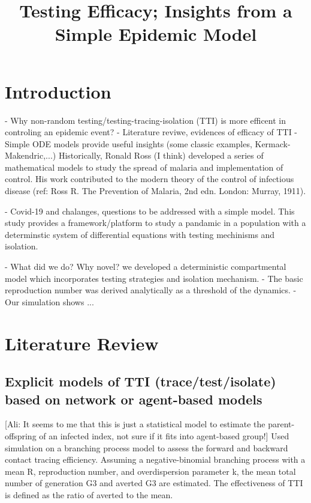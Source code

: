 \documentclass{article}
\title{Testing Efficacy; Insights from a Simple Epidemic Model }
\begin{document}
\maketitle

\section{Introduction}

- Why non-random testing/testing-tracing-isolation (TTI) is more efficent in controling an epidemic event?
- Literature reviwe, evidences of efficacy of TTI
- Simple ODE models provide useful insights (some classic examples, Kermack-Makendric,...)
Historically, Ronald Ross (I think) developed a series of mathematical models to study the spread of malaria and implementation of control. His work contributed to the modern theory of the control of
infectious disease (ref: Ross R. The Prevention of Malaria, 2nd edn. London: Murray, 1911).


- Covid-19 and chalanges, questions to be addressed with a simple model.
This study provides a framework/platform to study a pandamic in a population with a determinstic system of differential equations with testing mechinisms and isolation. 

- What did we do? Why novel? 
we developed a deterministic compartmental model which incorporates testing strategies and isolation mechanism. 
- The basic reproduction number was derived analytically as a threshold of the dynamics. 
- Our simulation shows ...

\section{Literature Review}

\subsection{Explicit models of TTI (trace/test/isolate) based on network or agent-based models}
\citep{endo2020implication} [Ali: It seems to me that this is just a statistical model to estimate the parent-offspring of an infected index, not sure if it fits into agent-based group!] Used simulation on a branching process model to assess the forward and backward contact tracing efficiency. Assuming a negative-binomial branching process with a mean R, reproduction number, and overdispersion parameter k, the mean total number of generation G3 and averted G3 are estimated. The effectiveness of TTI is defined as the ratio of averted to the mean.
\end{document}
